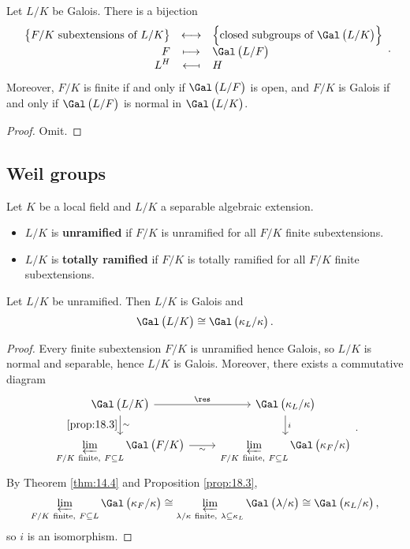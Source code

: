 \begin{theorem}
\label{thm:18.4}
Let $ L / K $ be Galois. There is a bijection
$$ \bijection{\cbr{F / K \ \text{subextensions of} \ L / K}}{\cbr{\text{closed subgroups of} \ \Gal\br{L / K}}}{F}{\Gal\br{L / F}}{L^H}{H}. $$
Moreover, $ F / K $ is finite if and only if $ \Gal\br{L / F} $ is open, and $ F / K $ is Galois if and only if $ \Gal\br{L / F} $ is normal in $ \Gal\br{L / K} $.
\end{theorem}

\begin{proof}
Omit.
\end{proof}

\subsection{Weil groups}

Let $ K $ be a local field and $ L / K $ a separable algebraic extension.

\begin{definition}
\hfill
\begin{itemize}
\item $ L / K $ is \textbf{unramified} if $ F / K $ is unramified for all $ F / K $ finite subextensions.
\item $ L / K $ is \textbf{totally ramified} if $ F / K $ is totally ramified for all $ F / K $ finite subextensions.
\end{itemize}
\end{definition}

\begin{proposition}
Let $ L / K $ be unramified. Then $ L / K $ is Galois and
$$ \Gal\br{L / K} \cong \Gal\br{\kappa_L / \kappa}. $$
\end{proposition}

\begin{proof}
Every finite subextension $ F / K $ is unramified hence Galois, so $ L / K $ is normal and separable, hence $ L / K $ is Galois. Moreover, there exists a commutative diagram
$$
\begin{tikzcd}
\Gal\br{L / K} \arrow{r}{\res} \arrow{d}{\sim}[swap]{\ref{prop:18.3}} & \Gal\br{\kappa_L / \kappa} \arrow{d}{i} \\
\displaystyle\varprojlim_{F / K \ \text{finite}, \ F \subseteq L} \Gal\br{F / K} \arrow{r}[swap]{\sim} & \displaystyle\varprojlim_{F / K \ \text{finite}, \ F \subseteq L} \Gal\br{\kappa_F / \kappa}
\end{tikzcd}.
$$
By Theorem \ref{thm:14.4} and Proposition \ref{prop:18.3},
$$ \varprojlim_{F / K \ \text{finite}, \ F \subseteq L} \Gal\br{\kappa_F / \kappa} \cong \varprojlim_{\lambda / \kappa \ \text{finite}, \ \lambda \subseteq \kappa_L} \Gal\br{\lambda / \kappa} \cong \Gal\br{\kappa_L / \kappa}, $$
so $ i $ is an isomorphism.
\end{proof}

